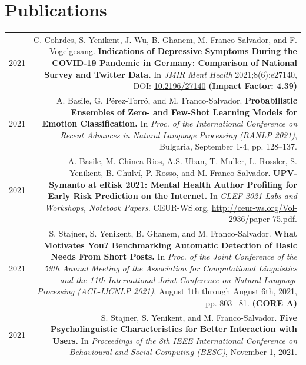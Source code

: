 \documentclass[10pt]{article}
\begin{document}
\section*{Publications}
\begin{tabular}{L!{\VRule}R}
	2021 & C. Cohrdes, S. Yenikent, J. Wu, B. Ghanem, M. Franco-Salvador, and F. Vogelgesang. \textbf{Indications of Depressive Symptoms During the COVID-19 Pandemic in Germany: Comparison of National Survey and Twitter Data.}
	In \emph{JMIR Ment Health} 2021;8(6):e27140, DOI: \href{https://doi.org/10.2196/27140}{10.2196/27140} \textbf{(Impact Factor: 4.39)} \vspace{5pt}\\
	2021 & A. Basile, G. P{\'e}rez-Torr{\'o}, and M. Franco-Salvador. \textbf{Probabilistic Ensembles of Zero- and Few-Shot Learning Models for Emotion Classification.}
	In \emph{Proc. of the International Conference on Recent Advances in Natural Language Processing (RANLP 2021)}, Bulgaria, September 1-4, pp. 128--137. \vspace{5pt}\\
	2021 & A. Basile, M. Chinea-Rios, A.S. Uban, T. Muller, L. Rossler, S. Yenikent, B. Chulv{\'i}, P. Rosso, and M. Franco-Salvador. \textbf{UPV-Symanto at eRisk 2021: Mental Health Author Profiling for Early Risk Prediction on the Internet.}
	In \emph{CLEF 2021 Labs and Workshops, Notebook Papers.} CEUR-WS.org, \href{http://ceur-ws.org/Vol-2936/paper-75.pdf}{http://ceur-ws.org/Vol-2936/paper-75.pdf}. \vspace{5pt}\\
	2021 & S. Stajner, S. Yenikent, B. Ghanem, and M. Franco-Salvador. \textbf{What Motivates You? Benchmarking Automatic Detection of Basic Needs From Short Posts.}
	In \emph{Proc. of the Joint Conference of the 59th Annual Meeting of the Association for Computational Linguistics and the 11th International Joint Conference on Natural Language Processing (ACL-IJCNLP 2021)}, August 1th through August 6th, 2021, pp.  803-–81. \textbf{(CORE A)}\vspace{5pt}\\
	2021 & S. Stajner, S. Yenikent, and M. Franco-Salvador. \textbf{Five Psycholinguistic Characteristics for Better Interaction with Users.}
	In \emph{Proceedings of the 8th IEEE International Conference on Behavioural and Social Computing (BESC)}, November 1, 2021.\vspace{5pt}\\	
\end{tabular}
\end{document}
